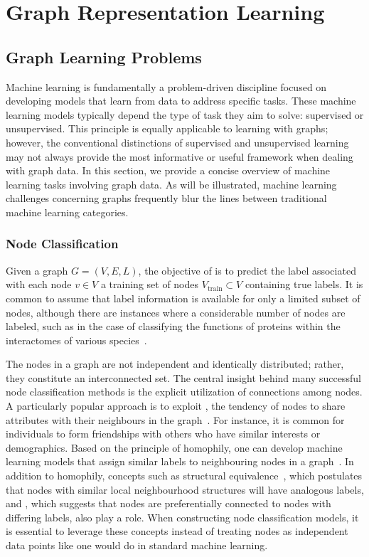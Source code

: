 \chapter{Graph Representation Learning}\label{grl}

\section{Graph Learning Problems}
Machine learning is fundamentally a problem-driven discipline focused on developing models that learn from data to address specific tasks. These machine learning models typically depend the type of task they aim to solve: supervised or unsupervised. This principle is equally applicable to learning with graphs; however, the conventional distinctions of supervised and unsupervised learning may not always provide the most informative or useful framework when dealing with graph data. In this section, we provide a concise overview of machine learning tasks involving graph data. As will be illustrated, machine learning challenges concerning graphs frequently blur the lines between traditional machine learning categories.

\subsection{Node Classification}
Given a graph $ G = (V,E,L) $, the objective of  is to predict the label associated with each node $ v \in V $ a training set of nodes $ V_\text{train} \subset V $ containing true labels. It is common to assume that label information is available for only a limited subset of nodes, although there are instances where a considerable number of nodes are labeled, such as in the case of classifying the functions of proteins within the interactomes of various species~\cite{Hamilton2017inductiveRepresentationLearning}.

The nodes in a graph are not independent and identically distributed; rather, they constitute an interconnected set. The central insight behind many successful node classification methods is the explicit utilization of connections among nodes. A particularly popular approach is to exploit , the tendency of nodes to share attributes with their neighbours in the graph~\cite{Mcpherson2001homophilyInSocialNw}. For instance, it is common for individuals to form friendships with others who have similar interests or demographics. Based on the principle of homophily, one can develop machine learning models that assign similar labels to neighbouring nodes in a graph~\cite{Zhou2003LearningLocalGlobalConsistency}. In addition to homophily, concepts such as structural equivalence~\cite{Donnat2017GraphWaveletsStructuralRoleSimilarityComplexNws}, which postulates that nodes with similar local neighbourhood structures will have analogous labels, and , which suggests that nodes are preferentially connected to nodes with differing labels, also play a role. When constructing node classification models, it is essential to leverage these concepts instead of treating nodes as independent data points like one would do in standard machine learning.

